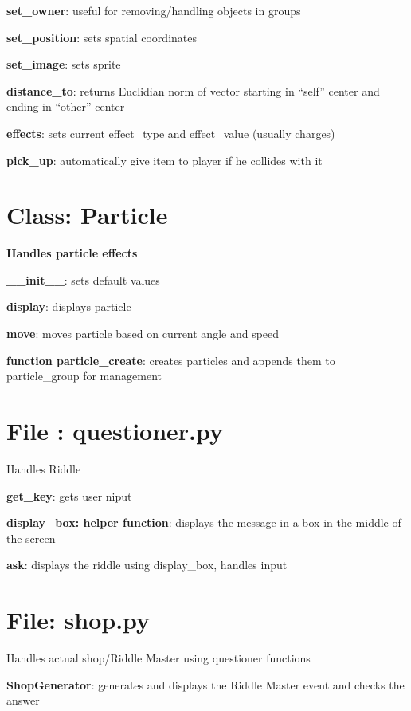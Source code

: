 \documentclass{article}
\begin{document}
\textbf{set\_owner}: useful for removing/handling objects in groups

\textbf{set\_position}: sets spatial coordinates

\textbf{set\_image}: sets sprite

\textbf{distance\_to}: returns Euclidian norm of vector starting in “self” center and ending in “other” center

\textbf{effects}: sets current effect\_type and effect\_value (usually charges)

\textbf{pick\_up}: automatically give item to player if he collides with it

\section{Class: Particle}

\textbf{Handles particle effects}

\textbf{\_\_init\_\_}: sets default values

\textbf{display}: displays particle

\textbf{move}: moves particle based on current angle and speed

\textbf{function particle\_create}: creates particles and appends them to particle\_group for management

\section{File : questioner.py}

Handles Riddle

\textbf{get\_key}: gets user niput

\textbf{display\_box: helper function}: displays the message in a box in the middle of the screen

\textbf{ask}: displays the riddle using display\_box, handles input

\section{File: shop.py}

Handles actual shop/Riddle Master using questioner functions

\textbf{ShopGenerator}: generates and displays the Riddle Master event and checks 
the answer
\end{document}

